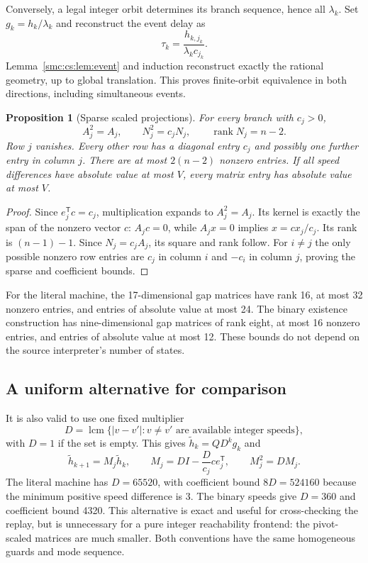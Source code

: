 \documentclass[11pt,letterpaper]{article}
\numberwithin{equation}{section}
\newtheorem{proposition}[theorem]{Proposition}
\theoremstyle{definition}
\theoremstyle{remark}
\begin{document}
Conversely, a legal integer orbit determines its branch sequence, hence all $\lambda_k$. Set $g_k=h_k/\lambda_k$ and reconstruct the event delay as
\[
 \tau_k=\frac{h_{k,j_k}}{\lambda_k c_{j_k}}.
\]
Lemma~\ref{smc:cs:lem:event} and induction reconstruct exactly the rational geometry, up to global translation. This proves finite-orbit equivalence in both directions, including simultaneous events.

\begin{proposition}[Sparse scaled projections]\label{smc:cs:prop:projection}
For every branch with $c_j>0$,
\[
 A_j^2=A_j,\qquad N_j^2=c_jN_j,\qquad
 \operatorname{rank}N_j=n-2.
\]
Row $j$ vanishes. Every other row has a diagonal entry $c_j$ and possibly one further entry in column $j$. There are at most $2(n-2)$ nonzero entries. If all speed differences have absolute value at most $V$, every matrix entry has absolute value at most $V$.
\end{proposition}
\begin{proof}
Since $e_j^{\mathsf T}c=c_j$, multiplication expands to $A_j^2=A_j$. Its kernel is exactly the span of the nonzero vector $c$: $A_jc=0$, while $A_jx=0$ implies $x=c x_j/c_j$. Its rank is $(n-1)-1$. Since $N_j=c_jA_j$, its square and rank follow. For $i\ne j$ the only possible nonzero row entries are $c_j$ in column $i$ and $-c_i$ in column $j$, proving the sparse and coefficient bounds.
\end{proof}

For the literal machine, the 17-dimensional gap matrices have rank 16, at most 32 nonzero entries, and entries of absolute value at most 24. The binary existence construction has nine-dimensional gap matrices of rank eight, at most 16 nonzero entries, and entries of absolute value at most 12. These bounds do not depend on the source interpreter's number of states.

\subsection{A uniform alternative for comparison}
It is also valid to use one fixed multiplier
\[
 D=\operatorname{lcm}\{|v-v'|:v\ne v'\text{ are available integer speeds}\},
\]
with $D=1$ if the set is empty. This gives $\widetilde h_k=QD^k g_k$ and
\begin{equation}\label{smc:cs:eq:global-lift}
 \widetilde h_{k+1}=M_j\widetilde h_k,\qquad
 M_j=DI-\frac{D}{c_j}c e_j^{\mathsf T},\qquad M_j^2=DM_j.
\end{equation}
The literal machine has $D=65520$, with coefficient bound $8D=524160$ because the minimum positive speed difference is 3. The binary speeds give $D=360$ and coefficient bound 4320. This alternative is exact and useful for cross-checking the replay, but is unnecessary for a pure integer reachability frontend: the pivot-scaled matrices are much smaller. Both conventions have the same homogeneous guards and mode sequence.
\end{document}
